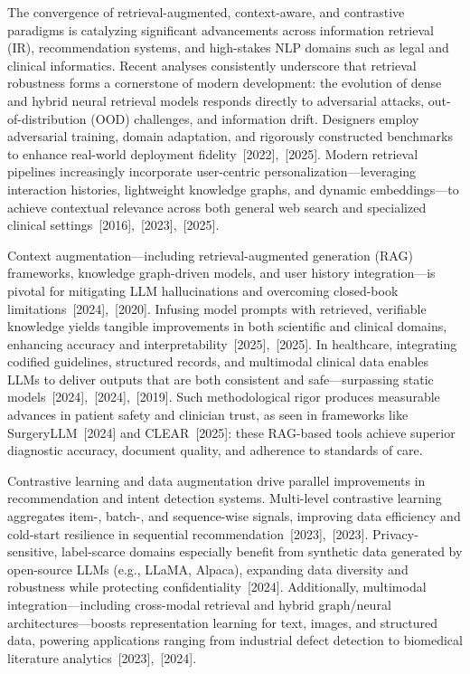 \documentclass[sigconf]{acmart}
\begin{document}
The convergence of retrieval-augmented, context-aware, and contrastive paradigms is catalyzing significant advancements across information retrieval (IR), recommendation systems, and high-stakes NLP domains such as legal and clinical informatics. Recent analyses consistently underscore that retrieval robustness forms a cornerstone of modern development: the evolution of dense and hybrid neural retrieval models responds directly to adversarial attacks, out-of-distribution (OOD) challenges, and information drift. Designers employ adversarial training, domain adaptation, and rigorously constructed benchmarks to enhance real-world deployment fidelity~\cite{ref4}[2022],~\cite{ref5}[2025]. Modern retrieval pipelines increasingly incorporate user-centric personalization—leveraging interaction histories, lightweight knowledge graphs, and dynamic embeddings—to achieve contextual relevance across both general web search and specialized clinical settings~\cite{ref24}[2016],~\cite{ref25}[2023],~\cite{ref49}[2025].

Context augmentation—including retrieval-augmented generation (RAG) frameworks, knowledge graph-driven models, and user history integration—is pivotal for mitigating LLM hallucinations and overcoming closed-book limitations~\cite{ref1}[2024],~\cite{ref10}[2020]. Infusing model prompts with retrieved, verifiable knowledge yields tangible improvements in both scientific and clinical domains, enhancing accuracy and interpretability~\cite{ref7}[2025],~\cite{ref11}[2025]. In healthcare, integrating codified guidelines, structured records, and multimodal clinical data enables LLMs to deliver outputs that are both consistent and safe—surpassing static models~\cite{ref6}[2024],~\cite{ref14}[2024],~\cite{ref17}[2019]. Such methodological rigor produces measurable advances in patient safety and clinician trust, as seen in frameworks like SurgeryLLM~\cite{ref1}[2024] and CLEAR~\cite{ref3}[2025]: these RAG-based tools achieve superior diagnostic accuracy, document quality, and adherence to standards of care.

Contrastive learning and data augmentation drive parallel improvements in recommendation and intent detection systems. Multi-level contrastive learning aggregates item-, batch-, and sequence-wise signals, improving data efficiency and cold-start resilience in sequential recommendation~\cite{ref58}[2023],~\cite{ref59}[2023]. Privacy-sensitive, label-scarce domains especially benefit from synthetic data generated by open-source LLMs (e.g., LLaMA, Alpaca), expanding data diversity and robustness while protecting confidentiality~\cite{ref57}[2024]. Additionally, multimodal integration—including cross-modal retrieval and hybrid graph/neural architectures—boosts representation learning for text, images, and structured data, powering applications ranging from industrial defect detection to biomedical literature analytics~\cite{ref15}[2023],~\cite{ref60}[2024].
\end{document}
